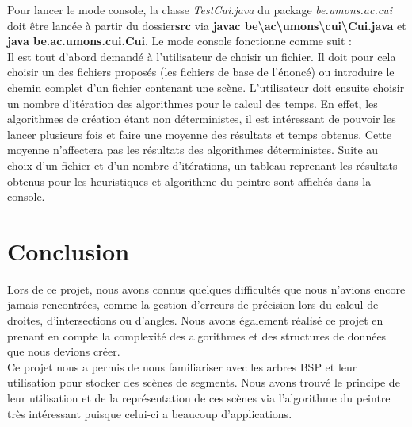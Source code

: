 \documentclass[11pt,a4paper]{article}
\theoremstyle{definition}
\theoremstyle{remark}
\begin{document}
Pour lancer le mode console, la classe \textit{TestCui.java} du package \textit{be.umons.ac.cui} doit être lancée à partir du dossier\textbf{src} via \textbf{javac be\textbackslash ac\textbackslash umons\textbackslash cui\textbackslash Cui.java} et \textbf{java be.ac.umons.cui.Cui}. Le mode console fonctionne comme suit :\\

Il est tout d'abord demandé à l'utilisateur de choisir un fichier. Il doit pour cela choisir un des fichiers proposés (les fichiers de base de l'énoncé) ou introduire le chemin complet d'un fichier contenant une scène. L'utilisateur doit ensuite choisir un nombre d'itération des algorithmes pour le calcul des temps. En effet, les algorithmes de création étant non déterministes, il est intéressant de pouvoir les lancer plusieurs fois et faire une moyenne des résultats et temps obtenus. Cette moyenne n'affectera pas les résultats des algorithmes déterministes. Suite au choix d'un fichier et d'un nombre d'itérations, un tableau reprenant les résultats obtenus pour les heuristiques et algorithme du peintre sont affichés dans la console.

\section*{Conclusion}
Lors de ce projet, nous avons connus quelques difficultés que nous n'avions encore jamais rencontrées, comme la gestion d'erreurs de précision lors du calcul de droites, d'intersections ou d'angles. Nous avons également réalisé ce projet en prenant en compte la complexité des algorithmes et des structures de données que nous devions créer.\\

Ce projet nous a permis de nous familiariser avec les arbres BSP et leur utilisation pour stocker des scènes de segments. Nous avons trouvé le principe de leur utilisation et de la représentation de ces scènes via l'algorithme du peintre très intéressant puisque celui-ci a beaucoup d'applications. 
\end{document}
